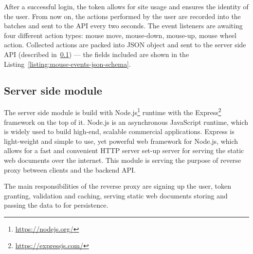 After a successful login, the token allows for site usage and ensures the identity of the user.
From now on, the actions performed by the user are recorded into the batches and sent to the API every two seconds.
The event listeners are awaiting four different action types: mouse move, mouse-down, mouse-up, mouse wheel action.
Collected actions are packed into JSON object and sent to the server side API (described in~\ref{subsec:server-side-module}) --- the fields included are shown in the Listing~\ref{listing:mouse-events-json-schema}.

% 

\subsection{Server side module}\label{subsec:server-side-module}
The server side module is build with Node.js\footnote{\url{https://nodejs.org/}} runtime with the Express\footnote{\url{https://expressjs.com/}} framework on the top of it.
Node.js is an asynchronous JavaScript runtime, which is widely used to build high-end, scalable commercial applications.
Express is light-weight and simple to use, yet powerful web framework for Node.js, which allows for a fast and convenient HTTP server set-up server for serving the static web documents over the internet.
This module is serving the purpose of reverse proxy between clients and the backend API.

The main responsibilities of the reverse proxy are signing up the user, token granting, validation and caching, serving static web documents storing and passing the data to for persistence.

